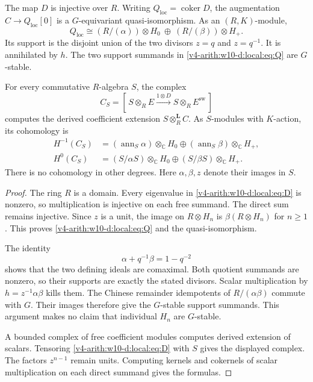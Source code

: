 \begin{theorem}\label{v4-arith:w10-d:local:thm:cone}
The map $D$ is injective over $R$.
Writing $Q_{\mathrm{loc}}=\operatorname{coker} D$, the augmentation $C\to Q_{\mathrm{loc}}[0]$ is a $G$-equivariant quasi-isomorphism.
As an $(R,K)$-module,
\begin{equation}\label{v4-arith:w10-d:local:eq:Q}
 Q_{\mathrm{loc}}\cong (R/(\alpha))\otimes H_0
       \ \oplus\ (R/(\beta))\otimes H_+.
\end{equation}
Its support is the disjoint union of the two divisors $z=q$ and $z=q^{-1}$.
It is annihilated by $h$.
The two support summands in \eqref{v4-arith:w10-d:local:eq:Q} are $G$-stable.

For every commutative $R$-algebra $S$, the complex
\[
 C_S=[\,S\otimes_R E\xrightarrow{1\otimes D}S\otimes_R E^\mathrm{sw}\,]
\]
computes the derived coefficient extension $S\otimes_R^{\mathbf L}C$.
As $S$-modules with $K$-action, its cohomology is
\begin{align*}
 H^{-1}(C_S)&=(\operatorname{ann}_S\alpha)\otimes_\mathbb C H_0
              \oplus(\operatorname{ann}_S\beta)\otimes_\mathbb C H_+,\\
 H^0(C_S)&=(S/\alpha S)\otimes_\mathbb C H_0
              \oplus(S/\beta S)\otimes_\mathbb C H_+.
\end{align*}
There is no cohomology in other degrees.
Here $\alpha,\beta,z$ denote their images in $S$.
\end{theorem}
\begin{proof}
The ring $R$ is a domain.
Every eigenvalue in \eqref{v4-arith:w10-d:local:eq:D} is nonzero, so multiplication is injective on each free summand.
The direct sum remains injective.
Since $z$ is a unit, the image on $R\otimes H_n$ is
$\beta(R\otimes H_n)$ for $n\ge1$.
This proves \eqref{v4-arith:w10-d:local:eq:Q} and the quasi-isomorphism.

The identity
\begin{equation}\label{v4-arith:w10-d:local:eq:bezout}
 \alpha+q^{-1}\beta=1-q^{-2}
\end{equation}
shows that the two defining ideals are comaximal.
Both quotient summands are nonzero, so their supports are exactly the stated divisors.
Scalar multiplication by $h=z^{-1}\alpha\beta$ kills them.
The Chinese remainder idempotents of $R/(\alpha\beta)$ commute with $G$.
Their images therefore give the $G$-stable support summands.
This argument makes no claim that individual $H_n$ are $G$-stable.

A bounded complex of free coefficient modules computes derived extension of scalars.
Tensoring \eqref{v4-arith:w10-d:local:eq:D} with $S$ gives the displayed complex.
The factors $z^{n-1}$ remain units.
Computing kernels and cokernels of scalar multiplication on each direct summand gives the formulas.
\end{proof}

